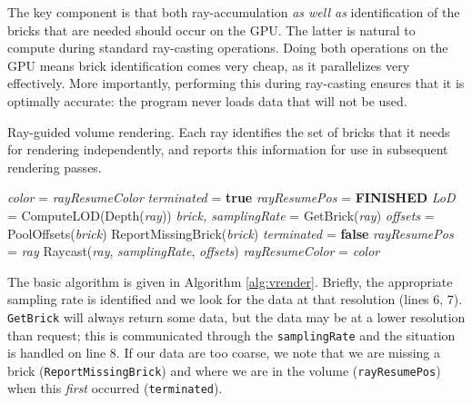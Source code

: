 
The key component is that both ray-accumulation \emph{as well
as} identification of the bricks that are needed should occur
on the GPU.  The latter is natural to compute during standard
ray-casting operations.  Doing both operations on the GPU means brick
identification comes very cheap, as it parallelizes very effectively.
More importantly, performing this during ray-casting ensures that it
is optimally accurate: the program never loads data that will not be
used.


\begin{algorithm}
  \caption{Ray-guided volume rendering.  Each ray identifies the
  set of bricks that it needs for rendering independently, and
  reports this information for use in subsequent rendering passes.}
  \label{alg:vrender}
  \begin{algorithmic}[1]
  \State \textit{color} = \textit{rayResumeColor}
  \State \textit{terminated} = \textbf{true} 
  \State \textit{rayResumePos} = \textbf{FINISHED}
  \Repeat
    \State \textit{LoD} = ComputeLOD(Depth(\textit{ray}))
    \State \textit{brick, samplingRate} = GetBrick(\textit{ray})
    \State \textit{offsets} = PoolOffsets(\textit{brick})
      \State ReportMissingBrick(\textit{brick})
       
        \State \textit{terminated} = \textbf{false}
        \State \textit{rayResumePos} = \textit{ray}
      \EndIf
    \EndIf
    \State Raycast(\textit{ray}, \textit{samplingRate}, \textit{offsets})
  \State \textit{rayResumeColor} = \textit{color}
  \end{algorithmic}
\end{algorithm}

The basic algorithm is given in Algorithm \ref{alg:vrender}.  Briefly, the
appropriate sampling rate is identified and we look for the data at
that resolution (lines 6, 7).
\texttt{GetBrick} will always return some data, but the data may be at
a lower resolution than request; this is
communicated through the \texttt{samplingRate} and the situation is handled
on line 8.  If our data are too coarse, we note that we are missing a
brick (\texttt{ReportMissingBrick}) and where we are in the volume
(\texttt{rayResumePos}) when
this \emph{first} occurred (\texttt{terminated}).

